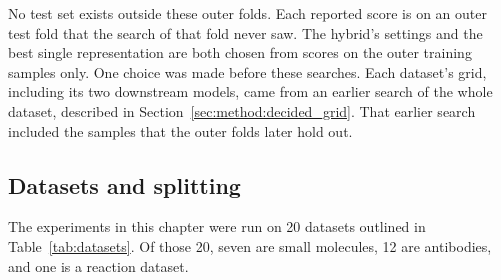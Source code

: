 No test set exists outside these outer folds. Each reported score is on an outer test fold that the search of that fold never saw. The hybrid's settings and the best single representation are both chosen from scores on the outer training samples only. One choice was made before these searches. Each dataset's grid, including its two downstream models, came from an earlier search of the whole dataset, described in Section~\ref{sec:method:decided_grid}. That earlier search included the samples that the outer folds later hold out.

\subsection{Datasets and splitting}\label{sec:method:datasets}

The experiments in this chapter were run on 20 datasets outlined in Table~\ref{tab:datasets}. Of those 20, seven are small molecules, 12 are antibodies, and one is a reaction dataset. 

